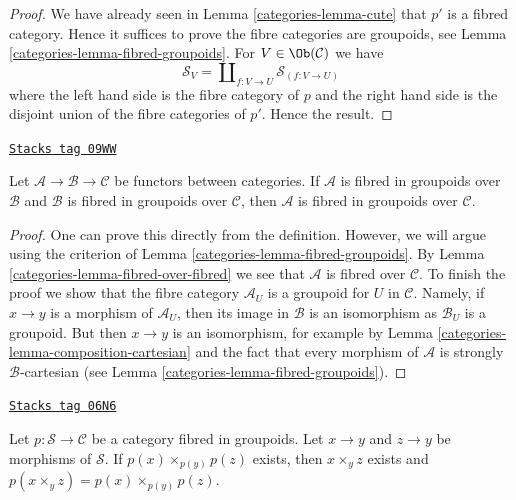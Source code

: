 \begin{proof}

We have already seen in Lemma \ref{categories-lemma-cute} that $p'$ is a fibred
category. Hence it suffices to prove the fibre categories are groupoids,
see Lemma \ref{categories-lemma-fibred-groupoids}.
For $V \in \Ob(\mathcal{C})$ we have
$$
\mathcal{S}_V = \coprod\nolimits_{f : V \to U} \mathcal{S}_{(f : V \to U)}
$$
where the left hand side is the fibre category of $p$ and the right hand side
is the disjoint union of the fibre categories of $p'$.
Hence the result.
\end{proof}

\begin{lemma}
\label{categories-lemma-fibred-in-groupoids-over-fibred-in-groupoids}
\href{https://stacks.math.columbia.edu/tag/09WW}{\texttt{Stacks tag 09WW}}

Let $\mathcal{A} \to \mathcal{B} \to \mathcal{C}$ be functors between
categories. If $\mathcal{A}$ is fibred in groupoids over $\mathcal{B}$
and $\mathcal{B}$ is fibred in groupoids over $\mathcal{C}$, then
$\mathcal{A}$ is fibred in groupoids over $\mathcal{C}$.
\end{lemma}

\begin{proof}

One can prove this directly from the definition. However, we will argue
using the criterion of Lemma \ref{categories-lemma-fibred-groupoids}.
By Lemma \ref{categories-lemma-fibred-over-fibred} we see that $\mathcal{A}$
is fibred over $\mathcal{C}$. To finish the proof we show that the fibre
category $\mathcal{A}_U$ is a groupoid for $U$ in $\mathcal{C}$.
Namely, if $x \to y$ is a morphism of $\mathcal{A}_U$, then its
image in $\mathcal{B}$ is an isomorphism as $\mathcal{B}_U$ is
a groupoid. But then $x \to y$ is an isomorphism, for example by
Lemma \ref{categories-lemma-composition-cartesian} and the fact that every
morphism of $\mathcal{A}$ is strongly $\mathcal{B}$-cartesian
(see Lemma \ref{categories-lemma-fibred-groupoids}).
\end{proof}

\begin{lemma}
\label{categories-lemma-fibred-groupoids-fibre-product-goes-up}
\href{https://stacks.math.columbia.edu/tag/06N6}{\texttt{Stacks tag 06N6}}

Let $p : \mathcal{S} \to \mathcal{C}$ be a category fibred in groupoids.
Let $x \to y$ and $z \to y$ be morphisms of $\mathcal{S}$.
If $p(x) \times_{p(y)} p(z)$ exists, then
$x \times_y z$ exists and $p(x \times_y z) = p(x) \times_{p(y)} p(z)$.
\end{lemma}

